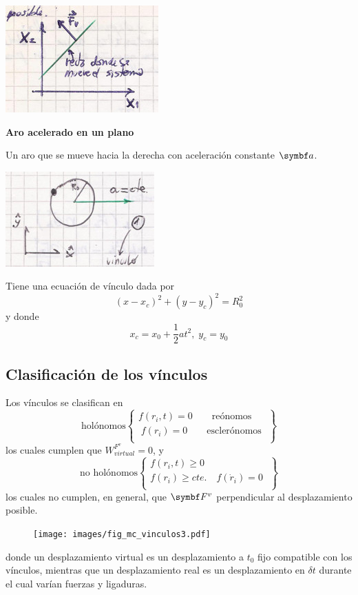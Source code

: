 \documentclass[10pt,oneside]{CBFT_book}
\begin{document}
\includegraphics[scale=0.35]{images/fig_mc_problema_bloques_fases.jpg}

\begin{ejemplo}{\bf Aro acelerado en un plano}

Un aro que se mueve hacia la derecha con aceleración constante $\vb{a}$. 

\includegraphics[scale=0.25]{images/fig_mc_aro_acelerado.jpg}

Tiene una ecuación de vínculo dada por 
\[
	(x-x_c)^2 + (y-y_c)^2 = R_0^2
\]
y donde 
\[
	x_c = x_0 + \frac 1 2 a t^2, \; y_c = y_0
\]
\end{ejemplo}

\subsection{Clasificación de los vínculos}

Los vínculos se clasifican en
\[
\textrm{holónomos} 
\begin{Bmatrix}
 f(r_i,t) = 0 \qquad \textrm{reónomos} \\
\; f(r_i) = 0 \qquad \textrm{esclerónomos} \;\\
\end{Bmatrix} 
\]
los cuales cumplen que  $W_{virtual}^{F^v}=0$, y
\[
\textrm{no holónomos} 
\begin{Bmatrix}
 f(r_i,t) \geq 0  \\
 f(r_i) \geq cte. \quad f(\dot{r}_i) = 0  \; \\
\end{Bmatrix}
\]
los cuales no cumplen, en general, que $\vb{F}^v$ perpendicular al desplazamiento posible.
\begin{figure}[hbt]
	\begin{center}
	\texttt{[image: images/fig\_mc\_vinculos3.pdf]}	
	\end{center}
	\caption{}
\end{figure} 
donde un desplazamiento virtual es un desplazamiento a $t_0$ fijo compatible con los vínculos,
mientras que un desplazamiento real es un desplazamiento en $\delta t$ durante el cual varían
fuerzas y ligaduras.
\end{document}
